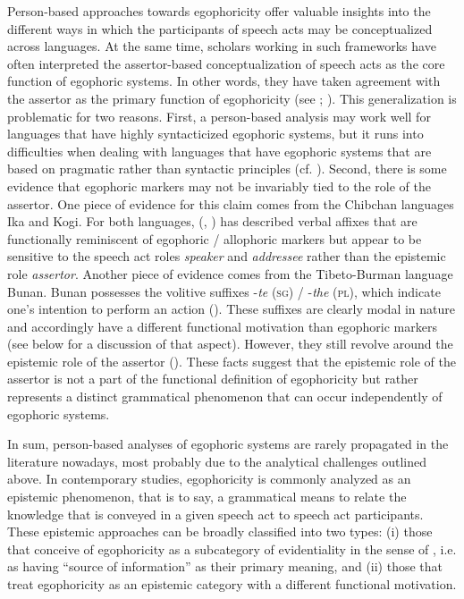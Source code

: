 \documentclass[output=paper]{langsci/langscibook}
\begin{document}
Person-based approaches towards egophoricity offer valuable insights into the different ways in which the participants of speech acts may be conceptualized across languages. At the same time, scholars working in such frameworks have often interpreted the assertor-based conceptualization of speech acts as the core function of egophoric systems. In other words, they have taken agreement with the assertor as the primary function of egophoricity (see \citealt{BickelNichols2007}; \citealt{Creissels2008}). This generalization is problematic for two reasons. First, a person-based analysis may work well for languages that have highly syntacticized egophoric systems, but it runs into difficulties when dealing with languages that have egophoric systems that are based on pragmatic rather than syntactic principles (cf. \citealt{SanRoque2018}). Second, there is some evidence that egophoric markers may not be invariably tied to the role of the assertor. One piece of evidence for this claim comes from the Chibchan languages Ika and Kogi. For both languages, \citeauthor{Bergqvist2012} (\citeyear{Bergqvist2012}, \citeyear{Bergqvist2016}) has described verbal affixes that are functionally reminiscent of egophoric / allophoric markers but appear to be sensitive to the speech act roles \emph{speaker} and \emph{addressee} rather than the epistemic role \emph{assertor}. Another piece of evidence comes from the Tibeto-Burman language Bunan. Bunan possesses the volitive suffixes -\textit{te} (\textsc{sg}) / -\textit{the} (\textsc{pl}), which indicate one’s intention to perform an action (\citealt[555--556]{Widmer2017a}). These suffixes are clearly modal in nature and accordingly have a different functional motivation than egophoric markers (see below for a discussion of that aspect). However, they still revolve around the epistemic role of the assertor (\citealt[453--459]{Widmer2017a}). These facts suggest that the epistemic role of the assertor is not a part of the functional definition of egophoricity but rather represents a distinct grammatical phenomenon that can occur independently of egophoric systems.

In sum, person-based analyses of egophoric systems are rarely propagated in the literature nowadays, most probably due to the analytical challenges outlined above. In contemporary studies, egophoricity is commonly analyzed as an epistemic phenomenon, that is to say, a grammatical means to relate the knowledge that is conveyed in a given speech act to speech act participants. These epistemic approaches can be broadly classified into two types: (i) those that conceive of egophoricity as a subcategory of evidentiality in the sense of \cite{Aikhenvald2004}, i.e. as having “source of information” as their primary meaning, and (ii) those that treat egophoricity as an epistemic category with a different functional motivation.
\end{document}
